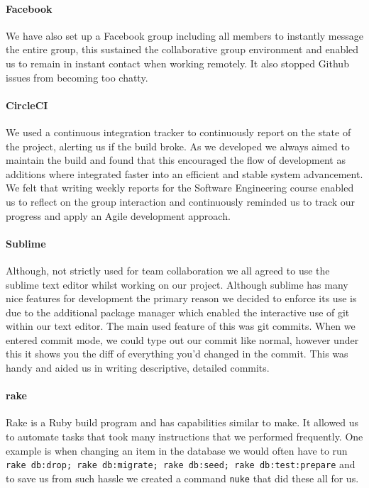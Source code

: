    \paragraph{Facebook\cite{facebook}} We have also set up a Facebook group including all members to instantly message the entire group, this sustained the collaborative group environment and enabled us to remain in instant contact when working remotely.
    It also stopped Github issues from becoming too chatty.

    \paragraph{CircleCI\cite{circleci}} We used a continuous integration tracker to continuously report on the state of the project, alerting us if the build broke. As we developed we always aimed to maintain the build and found that this encouraged the flow of development as additions where integrated faster into an efficient and stable system advancement.
    We felt that writing weekly reports for the Software Engineering course enabled us to reflect on the group interaction and continuously reminded us to track our progress and apply an Agile development approach.

    \paragraph{Sublime\cite{sublime}} Although, not strictly used for team collaboration we all agreed to use the sublime text editor whilst working on our project. Although sublime has many nice features for development the primary reason we decided to enforce its use is due to the additional package manager\cite{sublime_pm} which enabled the interactive use of git within our text editor.
    The main used feature of this was git commits. When we entered commit mode, we could type out our commit like normal, however under this it shows you the diff of everything you'd changed in the commit. This was handy and aided us in writing descriptive, detailed commits.

    \paragraph{rake\cite{rake}} Rake is a Ruby build program and has capabilities similar to make. It allowed us to automate tasks that took many instructions that we performed frequently. One example is when changing an item in the database we would often have to run \verb!rake db:drop; rake db:migrate; rake db:seed; rake db:test:prepare! and to save us from such hassle we created a command \verb!nuke! that did these all for us.

